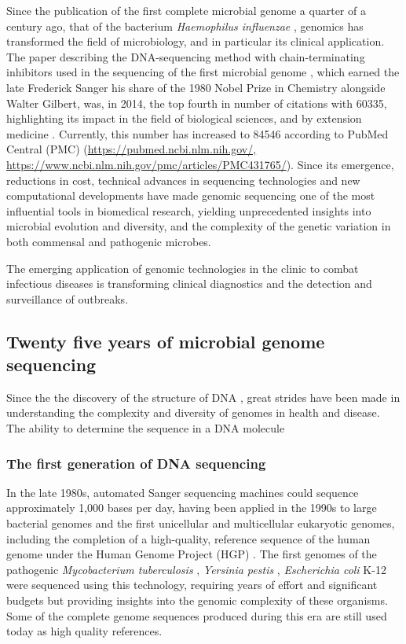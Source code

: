 Since the publication of the first complete microbial genome a quarter of a century ago, that of the bacterium \textit{Haemophilus influenzae} \citep{hood_dna_1996}, genomics has transformed the field of microbiology, and in particular its clinical application. The paper describing the DNA-sequencing method with chain-terminating inhibitors used in the sequencing of the first microbial genome \citep{sanger_dna_1977}, which earned the late Frederick Sanger his share of the 1980 Nobel Prize in Chemistry alongside Walter Gilbert, was, in 2014, the top fourth in number of citations with 60335, highlighting its impact in the field of biological sciences, and by extension medicine \citep{van_noorden_top_2014}. Currently, this number has increased to 84546 according to PubMed Central\textsuperscript{\small\textregistered} (PMC) (\url{https://pubmed.ncbi.nlm.nih.gov/, https://www.ncbi.nlm.nih.gov/pmc/articles/PMC431765/}). Since its emergence, reductions in cost, technical advances in sequencing technologies and new computational developments have made genomic sequencing one of the most influential tools in biomedical research, yielding unprecedented insights into microbial evolution and diversity, and the complexity of the genetic variation in both commensal and pathogenic microbes. 

The emerging application of genomic technologies in the clinic to combat infectious diseases is transforming clinical diagnostics and the detection and surveillance of outbreaks. 

\subsection{Twenty five years of microbial genome sequencing}

Since the  the discovery of the structure of DNA \citep{watson_molecular_1953}, great strides have been made in understanding the complexity and diversity of genomes in health and disease. The ability to determine the sequence in a DNA molecule  

\subsubsection{The first generation of DNA sequencing}

In the late 1980s, automated Sanger sequencing machines could sequence approximately 1,000 bases per day, having been applied in the 1990s to large bacterial genomes and the first unicellular and multicellular eukaryotic genomes, including the completion of a high-quality, reference sequence of the human genome under the Human Genome Project (HGP) \citep{koch_sequencing_2021, collins_human_1995}. The first genomes of the pathogenic \textit{Mycobacterium tuberculosis} \citep{cole_deciphering_1998}, \textit{Yersinia pestis} \citep{parkhill_genome_2001}, \textit{Escherichia coli} K-12 \citep{blattner_complete_1997} were sequenced using this technology, requiring years of effort and significant budgets but providing insights into the genomic complexity of these organisms. Some of the complete genome sequences produced during this era are still used today as high quality references. 

